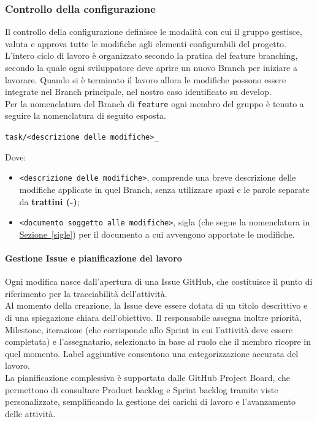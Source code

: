\documentclass[a4paper,12pt]{article}
\newcommand{\ignoreglossary}{}
\begin{document}
\subsubsection{Controllo della configurazione}
Il controllo della configurazione definisce le modalità con cui il gruppo gestisce, valuta e approva tutte le modifiche agli elementi configurabili del progetto.\\
L’intero ciclo di lavoro è organizzato secondo la pratica del feature branching, secondo la quale ogni sviluppatore deve aprire un nuovo Branch per iniziare a lavorare. Quando si è terminato il lavoro allora le modifiche possono essere integrate nel Branch principale, nel nostro caso identificato su develop.\\
Per la nomenclatura del Branch di \texttt{feature} ogni membro del gruppo è tenuto a seguire la nomenclatura di seguito esposta.
\begin{center}
    \texttt{task/<descrizione delle modifiche>\_<documento soggetto alle modifiche>}
\end{center}
Dove:
\begin{itemize}
    \item \texttt{<descrizione delle modifiche>}, comprende una breve descrizione delle modifiche applicate in quel Branch, senza utilizzare spazi e le parole separate da \textbf{trattini (-)};
    \item \texttt{<documento soggetto alle modifiche>}, sigla (che segue la nomenclatura in \hyperref[sigle]{Sezione~\ref*{sigle}}) per il documento a cui avvengono apportate le modifiche.
\end{itemize}

\paragraph{Gestione \ignoreglossary{Issue} e pianificazione del lavoro}
Ogni modifica nasce dall’apertura di una Issue GitHub, che costituisce il punto di riferimento per la tracciabilità dell’attività.\\ 
Al momento della creazione, la Issue deve essere dotata di un titolo descrittivo e di una spiegazione chiara dell’obiettivo. Il responsabile assegna inoltre priorità, Milestone, iterazione (che corrisponde allo Sprint in cui l’attività deve essere completata) e l’assegnatario, selezionato in base al ruolo che il membro ricopre in quel momento. Label aggiuntive consentono una categorizzazione accurata del lavoro.\\ 
La pianificazione complessiva è supportata dalle GitHub Project Board, che permettono di consultare Product backlog e Sprint backlog tramite viste personalizzate, semplificando la gestione dei carichi di lavoro e l’avanzamento delle attività.
\end{document}
